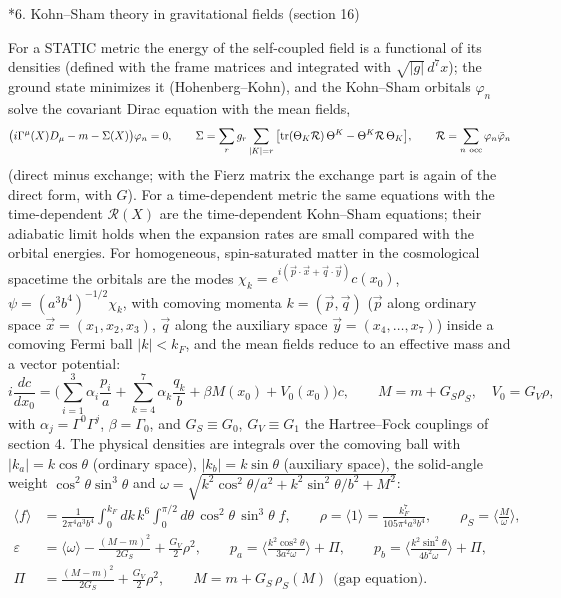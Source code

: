 \documentclass[10pt,a4paper]{article}
\makeatletter
\renewcommand\section{\@startsection{section}{1}{\z@}{-3.5ex \@plus -1ex \@minus -.2ex}{2.3ex \@plus.2ex}{\normalfont\Large\bfseries\raggedright}}
\makeatother
\begin{document}
\section*{6. Kohn–Sham theory in gravitational fields (section 16)}
For a STATIC metric the energy of the self-coupled field is a functional of its densities (defined with the frame matrices and integrated with $\sqrt{|g|}\,d^7x$); the ground state minimizes it (Hohenberg–Kohn), and the Kohn–Sham orbitals $\varphi_n$ solve the covariant Dirac equation with the mean fields,
\begin{equation*}
\big(i\Gamma^\mu(X)D_\mu-m-\Sigma(X)\big)\varphi_n=0,\qquad \Sigma=\sum_rg_r\sum_{|K|=r}\big[\mathrm{tr}(\Theta_K\mathcal R)\,\Theta^K-\Theta^K\mathcal R\,\Theta_K\big],\qquad \mathcal R=\sum_{n\ \rm occ}\varphi_n\bar\varphi_n
\end{equation*}
(direct minus exchange; with the Fierz matrix the exchange part is again of the direct form, with $G$). For a time-dependent metric the same equations with the time-dependent $\mathcal R(X)$ are the time-dependent Kohn–Sham equations; their adiabatic limit holds when the expansion rates are small compared with the orbital energies. For homogeneous, spin-saturated matter in the cosmological spacetime the orbitals are the modes $\chi_k=e^{i(\vec p\cdot\vec x+\vec q\cdot\vec y)}c(x_0)$, $\psi=(a^3b^4)^{-1/2}\chi_k$, with comoving momenta $k=(\vec p,\vec q)$ ($\vec p$ along ordinary space $\vec x=(x_1,x_2,x_3)$, $\vec q$ along the auxiliary space $\vec y=(x_4,\dots,x_7)$) inside a comoving Fermi ball $|k|<k_F$, and the mean fields reduce to an effective mass and a vector potential:
\begin{equation*}
i\frac{dc}{dx_0}=\Big(\sum_{i=1}^3\alpha_i\frac{p_i}{a}+\sum_{k=4}^7\alpha_k\frac{q_k}{b}+\beta M(x_0)+V_0(x_0)\Big)c,\qquad M=m+G_S\rho_S,\quad V_0=G_V\rho,
\end{equation*}
with $\alpha_j=\Gamma^0\Gamma^j$, $\beta=\Gamma_0$, and $G_S\equiv G_0$, $G_V\equiv G_1$ the Hartree–Fock couplings of section 4. The physical densities are integrals over the comoving ball with $|k_a|=k\cos\theta$ (ordinary space), $|k_b|=k\sin\theta$ (auxiliary space), the solid-angle weight $\cos^2\theta\sin^3\theta$ and $\omega=\sqrt{k^2\cos^2\theta/a^2+k^2\sin^2\theta/b^2+M^2}$:
\begin{align*}
\langle f\rangle&=\frac{1}{2\pi^4a^3b^4}\int_0^{k_F}dk\,k^6\int_0^{\pi/2}d\theta\,\cos^2\theta\,\sin^3\theta\;f,\qquad \rho=\langle1\rangle=\frac{k_F^7}{105\pi^4a^3b^4},\qquad \rho_S=\Big\langle\frac{M}{\omega}\Big\rangle, \\
\varepsilon&=\langle\omega\rangle-\frac{(M-m)^2}{2G_S}+\frac{G_V}{2}\rho^2,\qquad p_a=\Big\langle\frac{k^2\cos^2\theta}{3a^2\omega}\Big\rangle+\Pi,\qquad p_b=\Big\langle\frac{k^2\sin^2\theta}{4b^2\omega}\Big\rangle+\Pi, \\
\Pi&=\frac{(M-m)^2}{2G_S}+\frac{G_V}{2}\rho^2,\qquad M=m+G_S\,\rho_S(M)\ \ \text{(gap equation)} .
\end{align*}
\end{document}
